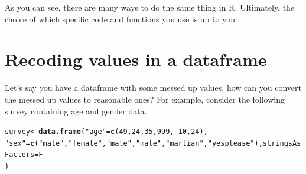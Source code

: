 \documentclass{tufte-book}\usepackage[]{graphicx}\usepackage[]{color}
\makeatletter
\newcommand{\hlnum}[1]{\textcolor[rgb]{0.686,0.059,0.569}{#1}}%
\newcommand{\hlstr}[1]{\textcolor[rgb]{0.192,0.494,0.8}{#1}}%
\newcommand{\hlcom}[1]{\textcolor[rgb]{0.678,0.584,0.686}{\textit{#1}}}%
\newcommand{\hlopt}[1]{\textcolor[rgb]{0,0,0}{#1}}%
\newcommand{\hlstd}[1]{\textcolor[rgb]{0.345,0.345,0.345}{#1}}%
\newcommand{\hlkwb}[1]{\textcolor[rgb]{0.69,0.353,0.396}{#1}}%
\newcommand{\hlkwc}[1]{\textcolor[rgb]{0.333,0.667,0.333}{#1}}%
\newcommand{\hlkwd}[1]{\textcolor[rgb]{0.737,0.353,0.396}{\textbf{#1}}}%
\newenvironment{kframe}{%
 \def\at@end@of@kframe{}%
 \ifinner\ifhmode%
  \def\at@end@of@kframe{\end{minipage}}%
  \begin{minipage}{\columnwidth}%
 \fi\fi%
 \def\FrameCommand##1{\hskip\@totalleftmargin \hskip-\fboxsep
 \colorbox{shadecolor}{##1}\hskip-\fboxsep
     \hskip-\linewidth \hskip-\@totalleftmargin \hskip\columnwidth}%
 \MakeFramed {\advance\hsize-\width
   \@totalleftmargin\z@ \linewidth\hsize
   \@setminipage}}%
 {\par\unskip\endMakeFramed%
 \at@end@of@kframe}
\newenvironment{knitrout}{}{} %
\makeatother
\begin{document}
\begin{footnotesize}

As you can see, there are many ways to do the same thing in R. Ultimately, the choice of which specific code and functions you use is up to you.

\section{Recoding values in a dataframe}

Let's say you have a dataframe with some messed up values, how can you convert the messed up values to reasonable ones? For example, consider the following survey containing age and gender data. 

\begin{knitrout}
\color{fgcolor}\begin{kframe}
\begin{alltt}
\hlstd{survey} \hlkwb{<-} \hlkwd{data.frame}\hlstd{(}\hlstr{"age"} \hlstd{=} \hlkwd{c}\hlstd{(}\hlnum{49}\hlstd{,} \hlnum{24}\hlstd{,} \hlnum{35}\hlstd{,} \hlnum{999}\hlstd{,} \hlopt{-}\hlnum{10}\hlstd{,} \hlnum{24}\hlstd{),}
                     \hlstr{"sex"} \hlstd{=} \hlkwd{c}\hlstd{(}\hlstr{"male"}\hlstd{,} \hlstr{"female"}\hlstd{,} \hlstr{"male"}\hlstd{,} \hlstr{"male"}\hlstd{,} \hlstr{"martian"}\hlstd{,} \hlstr{"yes please"}\hlstd{),} \hlkwc{stringsAsFactors} \hlstd{= F}
                     \hlstd{)}


\end{alltt}
\end{kframe}
\end{knitrout}
\end{footnotesize}
\end{document}
